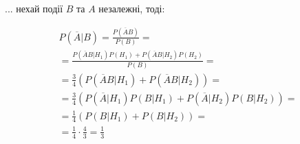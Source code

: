 \documentclass[12pt,letterpaper]{article}
\begin{document}
\begin{enumerate}
        ... нехай події $B$ та $A$ незалежні, тоді:

        \begin{gather*}
            P(\overline A | B) = \frac{P(\overline A B)}{P(B)} = \\
            = \frac{P(\overline A B|H_1)P(H_1) + P(\overline A B|H_2)P(H_2)}{P(B)} = \\
            = \frac{3}{4} ( P(\overline A B|H_1) + P(\overline A B|H_2) ) = \\
            = \frac{3}{4} ( P(\overline A|H_1) P(B|H_1)
                + P(\overline A | H_2) P(B|H_2) ) = \\
            = \frac{1}{4} ( P(B|H_1) + P(B|H_2) ) = \\
            = \frac{1}{4} \cdot \frac{4}{3} = \frac{1}{3}
        \end{gather*}

\end{enumerate}
 

\end{document}
